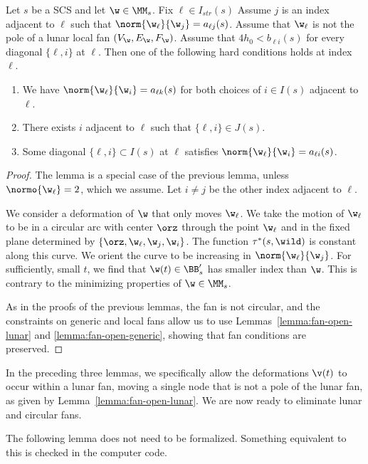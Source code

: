\begin{lemma}\label{lemma:nux2}
Let $s$ be a SCS and let $\w\in \MM_s$.   Fix $\ell\in I_{str}(s)$
Assume $j$ is an index adjacent to $\ell$ such  that $\norm{\w_\ell}{\w_j}=a_{\ell j}(s)$.
Assume  that $\w_\ell$ is not the pole of a lunar local fan $(V_\w,E_\w,F_\w)$.
Assume that $4h_0 < b_{\ell i}(s)$ for every diagonal $\{\ell,i\}$ at $\ell$.
Then
one of the following hard conditions holds at index $\ell$.
\begin{enumerate}
\item We have $\norm{\w_\ell}{\w_i}=a_{\ell k}(s)$
for both choices of $i\in I(s)$ adjacent to $\ell$.
\item There exists $i$ adjacent to $\ell$ such that $\{\ell,i\}\in J(s)$.
\item Some diagonal $\{\ell,i\}\subset I(s)$ at $\ell$ satisfies
$\norm{\w_\ell}{\w_i}=a_{\ell i}(s)$.
\end{enumerate}
\end{lemma}

\begin{proof} 
The lemma is a special
case of the previous lemma, unless $\normo{\w_\ell}=2$, which we assume.
Let $i\ne j$ be the other index adjacent to $\ell$.

We consider a deformation of $\w$ that only moves $\w_\ell$.  We take
the motion of $\w_\ell$ to be
in a circular arc with center $\orz$ through the point $\w_\ell$ and in
the fixed plane determined by $\{\orz,\w_\ell,\w_j,\w_{i}\}$.  
The function $\tau^*(s,\wild)$ is
constant along this curve.  We orient the curve to be increasing
in $\norm{\w_\ell}{\w_{j}}$.  For sufficiently, small $t$, we find that
$\w(t)\in\BB'_s$ has smaller index than $\w$.  This is contrary to the minimizing
properties of $\w\in\MM_s$.

As in the proofs of the previous lemmas, the fan is not circular, and 
the constraints on generic and local fans
allow us to use Lemmas~\ref{lemma:fan-open-lunar} and
\ref{lemma:fan-open-generic}, showing that fan conditions are preserved.
\end{proof}

In the preceding three lemmas, we specifically allow the deformations
$\v(t)$ to occur within a lunar fan, moving a single node that is not a pole
of the lunar fan, as given by Lemma~\ref{lemma:fan-open-lunar}.
We are now ready to eliminate  lunar and circular
fans.

The following lemma does not need to be formalized.  Something
equivalent
to this is checked in the computer code.

